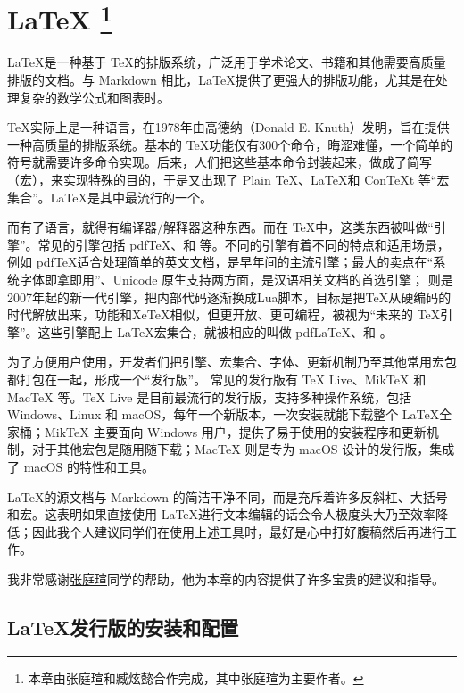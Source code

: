 \chapter[\LaTeX]{\LaTeX%
  \protect\footnote{本章由张庭瑄和臧炫懿合作完成，其中张庭瑄为主要作者。}}\label{sec:latex}

\LaTeX 是一种基于 \TeX 的排版系统，广泛用于学术论文、书籍和其他需要高质量排版的文档。与 Markdown 相比，\LaTeX 提供了更强大的排版功能，尤其是在处理复杂的数学公式和图表时。

\TeX 实际上是一种语言，在1978年由高德纳（Donald E. Knuth）发明，旨在提供一种高质量的排版系统。基本的 \TeX 功能仅有300个命令，晦涩难懂，一个简单的符号就需要许多命令实现。后来，人们把这些基本命令封装起来，做成了简写（宏），来实现特殊的目的，于是又出现了 Plain TeX、\LaTeX 和 ConTeXt 等“宏集合”。\LaTeX 是其中最流行的一个。

而有了语言，就得有编译器/解释器这种东西。而在 \TeX 中，这类东西被叫做“引擎”。常见的引擎包括 pdf\TeX、\XeTeX 和 \LuaTeX 等。不同的引擎有着不同的特点和适用场景，例如 pdf\TeX 适合处理简单的英文文档，是早年间的主流引擎；\XeTeX 最大的卖点在“系统字体即拿即用”、Unicode 原生支持两方面，是汉语相关文档的首选引擎； \LuaTeX 则是2007年起的新一代引擎，把内部代码逐渐换成Lua脚本，目标是把\TeX 从硬编码的时代解放出来，功能和XeTeX相似，但更开放、更可编程，被视为“未来的 \TeX 引擎”。这些引擎配上 \LaTeX 宏集合，就被相应的叫做 pdf\LaTeX、\XeLaTeX 和 \LuaLaTeX。

为了方便用户使用，开发者们把引擎、宏集合、字体、更新机制乃至其他常用宏包都打包在一起，形成一个“发行版”。 常见的发行版有 TeX Live、MikTeX 和 MacTeX 等。TeX Live 是目前最流行的发行版，支持多种操作系统，包括 Windows、Linux 和 macOS，每年一个新版本，一次安装就能下载整个 \LaTeX 全家桶；MikTeX 主要面向 Windows 用户，提供了易于使用的安装程序和更新机制，对于其他宏包是随用随下载；MacTeX 则是专为 macOS 设计的发行版，集成了 macOS 的特性和工具。

LaTeX的源文档与 Markdown 的简洁干净不同，而是充斥着许多反斜杠、大括号和宏。这表明如果直接使用 \LaTeX 进行文本编辑的话会令人极度头大乃至效率降低；因此我个人建议同学们在使用上述工具时，最好是心中打好腹稿然后再进行工作。

我非常感谢\href{https://github.com/AlphaZTX}{张庭瑄}同学的帮助，他为本章的内容提供了许多宝贵的建议和指导。

\section{ \LaTeX 发行版的安装和配置}

